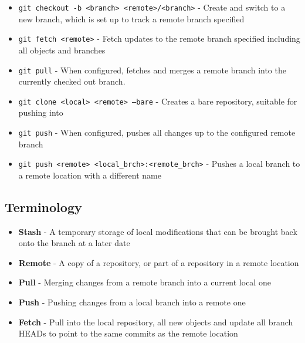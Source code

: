 \begin{itemize}
\item\texttt{git checkout -b <branch> <remote>/<branch>} - Create and switch to a new branch, which is set up to track a remote branch specified

\item\texttt{git fetch <remote>} - Fetch updates to the remote branch specified including all objects and branches

\item\texttt{git pull} - When configured, fetches and merges a remote branch into the currently checked out branch.

\item\texttt{git clone <local> <remote> --bare} - Creates a bare repository, suitable for pushing into

\item\texttt{git push} - When configured, pushes all changes up to the configured remote branch

\item\texttt{git push <remote> <local\_brch>:<remote\_brch>} - Pushes a local branch to a remote location with a different name

\end{itemize}

\subsection{Terminology}
\begin{itemize}
\item\textbf{Stash} - A temporary storage of local modifications that can be brought back onto the branch at a later date
\item\textbf{Remote} - A copy of a repository, or part of a repository in a remote location
\item\textbf{Pull} - Merging changes from a remote branch into a current local one
\item\textbf{Push} - Pushing changes from a local branch into a remote one
\item\textbf{Fetch} - Pull into the local repository, all new objects and update all branch HEADs to point to the same commits as the remote location
\end{itemize}
